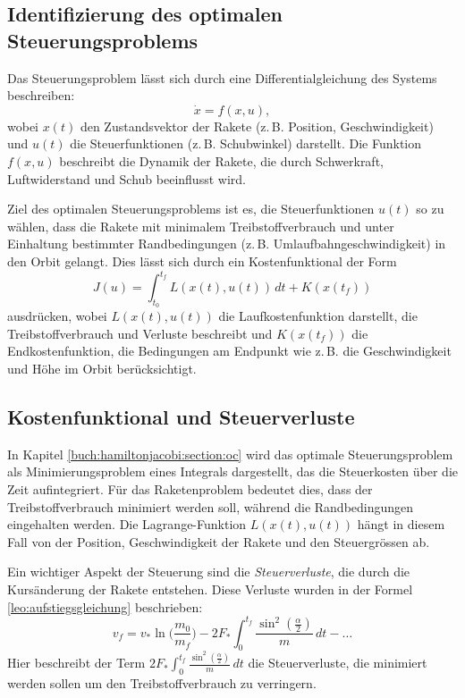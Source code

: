 \subsection{Identifizierung des optimalen Steuerungsproblems}

Das Steuerungsproblem lässt sich durch eine Differentialgleichung des Systems beschreiben:
\[
\dot{x} = f(x,u),
\]
wobei \(x(t)\) den Zustandsvektor der Rakete (z.\,B. Position, Geschwindigkeit) und \(u(t)\) die Steuerfunktionen (z.\,B. Schubwinkel) darstellt. 
Die Funktion \(f(x,u)\) beschreibt die Dynamik der Rakete, die durch Schwerkraft, Luftwiderstand und Schub beeinflusst wird.

Ziel des optimalen Steuerungsproblems ist es, die Steuerfunktionen \(u(t)\) so zu wählen, dass die Rakete mit minimalem Treibstoffverbrauch und unter Einhaltung bestimmter Randbedingungen (z.\,B. Umlaufbahngeschwindigkeit) in den Orbit gelangt. 
Dies lässt sich durch ein Kostenfunktional der Form
%
\[
J(u) = \int_{t_0}^{t_f} L(x(t), u(t))\, dt + K(x(t_f))
\]
ausdrücken,
wobei \(L(x(t), u(t))\) die Laufkostenfunktion darstellt, die Treibstoffverbrauch und Verluste beschreibt und \(K(x(t_f))\) die Endkostenfunktion, die Bedingungen am Endpunkt wie z.\,B. die Geschwindigkeit und Höhe im Orbit berücksichtigt.
%
%

\subsection{Kostenfunktional und Steuerverluste}

In Kapitel \ref{buch:hamiltonjacobi:section:oc} wird das optimale Steuerungsproblem als Minimierungsproblem eines Integrals dargestellt, das die Steuerkosten über die Zeit aufintegriert. 
Für das Raketenproblem bedeutet dies, dass der Treibstoffverbrauch minimiert werden soll, während die Randbedingungen eingehalten werden. 
Die Lagrange-Funktion \(L(x(t), u(t))\) hängt in diesem Fall von der Position, Geschwindigkeit der Rakete und den Steuergrössen ab.

Ein wichtiger Aspekt der Steuerung sind die \textit{Steuerverluste}, die durch die Kursänderung der Rakete entstehen. Diese Verluste wurden in der Formel \eqref{leo:aufstiegsgleichung} beschrieben:
\[
v_f = v_* \ln \biggl(\frac{m_0}{m_f}\biggr) - 2F_* \int_0^{t_f} \frac{\sin^2\left(\frac{\alpha}{2}\right)}{m} \, dt - \dots
\]
Hier beschreibt der Term \(2F_* \int_0^{t_f} \frac{\sin^2\left(\frac{\alpha}{2}\right)}{m} \, dt\) die Steuerverluste, die minimiert werden sollen um den Treibstoffverbrauch zu verringern.

